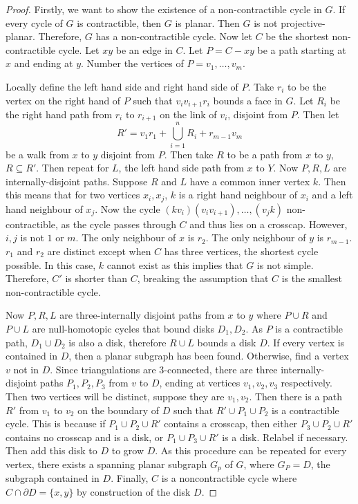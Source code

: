 \begin{proof}
     Firstly, we want to show the existence of a non-contractible cycle in $G$. If every cycle of $G$ is contractible, then $G$ is planar. Then $G$ is not projective-planar. Therefore, $G$ has a non-contractible cycle. Now let $C$ be the shortest non-contractible cycle. Let $xy$ be an edge in $C$. Let $P = C - xy$ be a path starting at $x$ and ending at $y$. 
    Number the vertices of $P = v_1, \ldots, v_m$. 

    Locally define the left hand side and right hand side of $P$. Take $r_i$ to be the vertex on the right hand of $P$ such that $v_i v_{i + 1} r_i$ bounds a face in $G$. Let $R_i$ be the right hand path from $r_i$ to $r_{i + 1}$ on the link of $v_i$, disjoint from $P$. Then let 
    \begin{equation*}
        R' = v_1 r_1 + \bigcup_{i = 1}^n R_i + r_{m-1} v_m
    \end{equation*}
    be a walk from $x$ to $y$ disjoint from $P$. Then take $R$ to be a path from $x$ to $y$, $R \subseteq R'$. Then repeat for $L$, the left hand side path from $x$ to $Y$. Now $P, R, L$ are internally-disjoint paths. Suppose $R$ and $L$ have a common inner vertex $k$. Then this means that for two vertices $x_i, x_j$, $k$ is a right hand neighbour of $x_i$ and a left hand neighbour of $x_j$. Now the cycle $(k v_i) (v_i v_{i + 1}), \ldots , (v_j k)$ non-contractible, as the cycle passes through $C$ and thus lies on a crosscap. However, $i, j$ is not $1$ or $m$. The only neighbour of $x$ is $r_2$. The only neighbour of $y$ is $r_{m-1}$. $r_1$ and $r_2$ are distinct except when $C$ has three vertices, the shortest cycle possible. In this case, $k$ cannot exist as this implies that $G$ is not simple. Therefore, $C'$ is shorter than $C$, breaking the assumption that $C$ is the smallest non-contractible cycle.

    Now $P, R, L$ are three-internally disjoint paths from $x$ to $y$ where $P \cup R$ and $P \cup L$ are null-homotopic cycles that bound disks $D_1, D_2$. As $P$ is a contractible path, $D_1 \cup D_2$ is also a disk, therefore $R \cup L$ bounds a disk $D$. If every vertex is contained in $D$, then a planar subgraph has been found. Otherwise, find a vertex $v$ not in $D$. Since triangulations are 3-connected, there are three internally-disjoint paths $P_1, P_2, P_3$ from $v$ to $D$, ending at vertices $v_1, v_2, v_3$ respectively. Then two vertices will be distinct, suppose they are $v_1, v_2$. Then there is a path $R'$ from $v_1$ to $v_2$ on the boundary of $D$ such that $R' \cup P_1 \cup P_2$ is a contractible cycle. This is because if $P_1 \cup P_2 \cup R'$ contains a crosscap, then either $P_3 \cup P_2 \cup R'$ contains no crosscap and is a disk, or $P_1 \cup P_3 \cup R'$ is a disk. Relabel if necessary. Then add this disk to $D$ to grow $D$. As this procedure can be repeated for every vertex, there exists a spanning planar subgraph $G_p$ of $G$, where $G_P = D$, the subgraph contained in $D$. Finally, $C$ is a noncontractible cycle where $C \cap \partial D = \{x, y\}$ by construction of the disk $D$. 
\end{proof}
